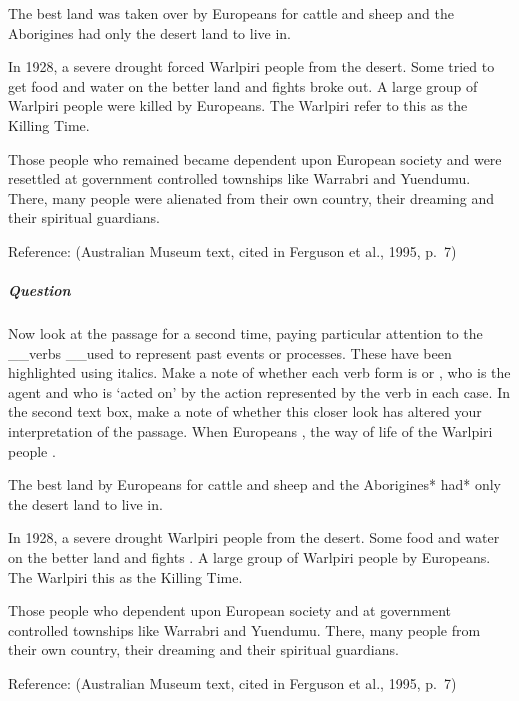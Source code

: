 \documentclass[letterpaper,10pt,english]{sphinxmanual}
\begin{document}
The best land was taken over by Europeans for cattle and sheep and the Aborigines had only the desert land to live in.

In 1928, a severe drought forced Warlpiri people from the desert. Some tried to get food and water on the better land and fights broke out. A large group of Warlpiri people were killed by Europeans. The Warlpiri refer to this as the Killing Time.

Those people who remained became dependent upon European society and were resettled at government controlled townships like Warrabri and Yuendumu. There, many people were alienated from their own country, their dreaming and their spiritual guardians.

Reference: (Australian Museum text, cited in Ferguson et al., 1995, p. 7)




\subparagraph{Question}
\label{\detokenize{content/session_00/Part_00_03:id1}}
Now look at the passage for a second time, paying particular attention to the \_\_verbs \_\_used to represent past events or processes. These have been highlighted using italics. Make a note of whether each verb form is  or , who is the agent and who is ‘acted on’ by the action represented by the verb in each case. In the second text box, make a note of whether this closer look has altered your interpretation of the passage. When Europeans , the way of life of the
Warlpiri people .

The best land  by Europeans for cattle and sheep and the Aborigines* had* only the desert land to live in.

In 1928, a severe drought  Warlpiri people from the desert. Some  food and water on the better land and fights . A large group of Warlpiri people  by Europeans. The Warlpiri  this as the Killing Time.

Those people who  dependent upon European society and  at government controlled townships like Warrabri and Yuendumu. There, many people  from their own country, their dreaming and their spiritual guardians.

Reference: (Australian Museum text, cited in Ferguson et al., 1995, p. 7)
\end{document}
